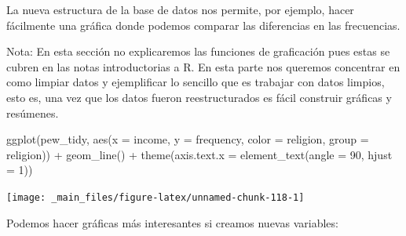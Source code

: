 \documentclass[
]{book}
\newenvironment{Shaded}{\begin{snugshade}}{\end{snugshade}}
\newcommand{\AttributeTok}[1]{\textcolor[rgb]{0.77,0.63,0.00}{#1}}
\newcommand{\DecValTok}[1]{\textcolor[rgb]{0.00,0.00,0.81}{#1}}
\newcommand{\FunctionTok}[1]{\textcolor[rgb]{0.00,0.00,0.00}{#1}}
\newcommand{\NormalTok}[1]{#1}
\newcommand{\SpecialCharTok}[1]{\textcolor[rgb]{0.00,0.00,0.00}{#1}}
\begin{document}
La nueva estructura de la base de datos nos permite, por ejemplo, hacer
fácilmente una gráfica donde podemos comparar las diferencias en las
frecuencias.

Nota: En esta sección no explicaremos las funciones de graficación pues estas
se cubren en las notas introductorias a R. En esta parte nos queremos concentrar
en como limpiar datos y ejemplificar lo sencillo que es trabajar con datos
limpios, esto es, una vez que los datos fueron reestructurados es fácil
construir gráficas y resúmenes.

\begin{Shaded}
\begin{Highlighting}[]
\FunctionTok{ggplot}\NormalTok{(pew\_tidy, }\FunctionTok{aes}\NormalTok{(}\AttributeTok{x =}\NormalTok{ income, }\AttributeTok{y =}\NormalTok{ frequency, }\AttributeTok{color =}\NormalTok{ religion, }\AttributeTok{group =}\NormalTok{ religion)) }\SpecialCharTok{+}
  \FunctionTok{geom\_line}\NormalTok{() }\SpecialCharTok{+} 
  \FunctionTok{theme}\NormalTok{(}\AttributeTok{axis.text.x =} \FunctionTok{element\_text}\NormalTok{(}\AttributeTok{angle =} \DecValTok{90}\NormalTok{, }\AttributeTok{hjust =} \DecValTok{1}\NormalTok{))}
\end{Highlighting}
\end{Shaded}

\begin{center}\texttt{[image: \_main\_files/figure-latex/unnamed-chunk-118-1]} \end{center}

Podemos hacer gráficas más interesantes si creamos nuevas variables:
\end{document}
